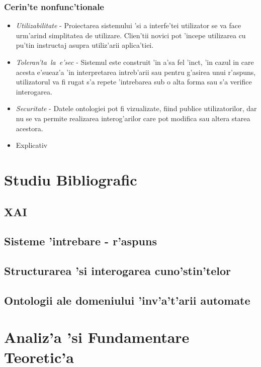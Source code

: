 \documentclass[12pt,a4paper,twoside]{report}
\begin{document}
\subsection{Cerin'te nonfunc'tionale}
\begin{itemize}
    \item {\it Utilizabilitate} - Proiectarea sistemului 'si a interfe'tei utilizator se va face urm'arind simplitatea de utilizare. Clien'tii novici pot 'incepe utilizarea cu pu'tin instructaj asupra utiliz'arii aplica'tiei.
    \item {\it Toleran'ta\ la\ e'sec} - Sistemul este construit 'in a'sa fel 'inc\ia t, 'in cazul in care acesta e'sueaz'a 'in interpretarea intreb'arii sau pentru g'asirea unui r'aspuns, utilizatorul va fi rugat s'a repete 'intrebarea sub o alta forma sau s'a verifice interogarea.
    \item {\it Securitate} - Datele ontologiei pot fi vizualizate, fiind publice utilizatorilor, dar nu se va permite realizarea interog'arilor care pot modifica  sau altera starea acestora.
    \item Explicativ
\end{itemize}

\chapter{Studiu Bibliografic}

\section{XAI}
\section{Sisteme 'intrebare - r'aspuns}
\section{Structurarea 'si interogarea cuno'stin'telor}
\section{Ontologii ale domeniului 'inv'a't'arii automate}

\chapter{Analiz'a 'si Fundamentare Teoretic'a}
\label{ch:analysis}
\end{document}

